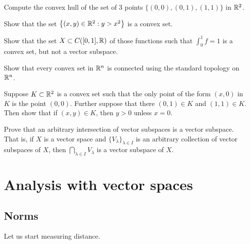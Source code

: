\begin{exercise}
Compute the convex hull of the set of 3 points
$\bigl\{ (0,0), (0,1), (1,1) \bigr\}$
in ${\mathbb{R}}^2$.
\end{exercise}

\begin{exercise}
Show that the set $\bigl\{ (x,y) \in {\mathbb{R}}^2 : y > x^2 \bigr\}$ is a convex set.
\end{exercise}

\begin{exercise}
Show that the set $X \subset C([0,1],{\mathbb{R}})$ of those functions such 
that $\int_0^1 f = 1$ is a convex set, but not a vector subspace.
\end{exercise}


\begin{exercise}
Show that every convex set in ${\mathbb{R}}^n$ is connected using the standard
topology on ${\mathbb{R}}^n$.
\end{exercise}

\begin{exercise}
Suppose $K \subset {\mathbb{R}}^2$ is a convex set such that the only point of
the form $(x,0)$ in $K$ is the point $(0,0)$.  Further suppose that
there $(0,1) \in K$ and $(1,1) \in K$.  Then show that if $(x,y) \in K$,
then $y > 0$ unless $x=0$.
\end{exercise}

\begin{exercise}
Prove that an arbitrary intersection of vector subspaces
is a vector subspace.
That is, if $X$ is a vector space and
$\{ V_\lambda \}_{\lambda \in I}$ is
an arbitrary collection of vector subspaces of $X$,
then
$\bigcap_{\lambda \in I} V_\lambda$ is a vector subspace of $X$.
\end{exercise}


\sectionnewpage
\section{Analysis with vector spaces}
\label{sec:normsmatsdets}


\subsection{Norms}

Let us start measuring distance.

